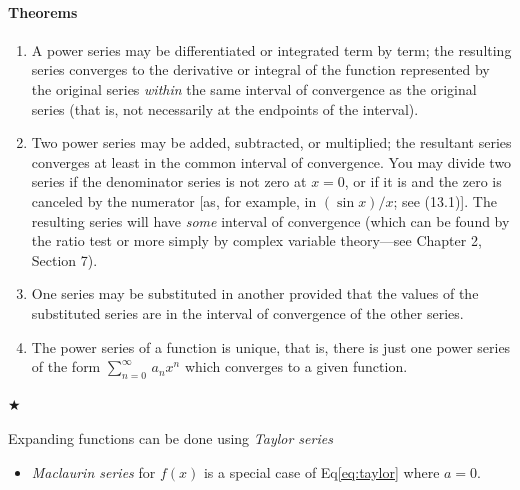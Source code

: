         \paragraph{Theorems}
            \begin{enumerate}
                \item A power series may be differentiated or integrated term by term; 
                the resulting series converges to the derivative or integral of the function 
                represented by the original series \textit{within} the same interval of convergence as the 
                original series (that is, not necessarily at the endpoints of the interval).
                \item Two power series may be added, subtracted, or multiplied; the resultant series 
                converges at least in the common interval of convergence. You may divide two series if 
                the denominator series is not zero at $x = 0$, or if it is and the zero is canceled by 
                the numerator [as, for example, in $(\sin{x})/x$; see (13.1)]. The resulting series will 
                have \textit{some} interval of convergence (which can be found by the ratio test or more simply 
                by complex variable theory—see Chapter 2, Section 7).
                \item One series may be substituted in another provided that the values of the substituted series 
                are in the interval of convergence of the other series.
                \item The power series of a function is unique, that is, there is just one power series of the 
                form $\sum_{n=0}^{\infty}\, a_nx^n$ which converges to a given function.
            \end{enumerate}

            \paragraph{$\bigstar$}
                Expanding functions can be done using \textit{Taylor series}
            
            \begin{itemize}
                \item \textit{Maclaurin series} for $f(x)$ is a special case of Eq\eqref{eq:taylor} where $a=0$.
            \end{itemize}